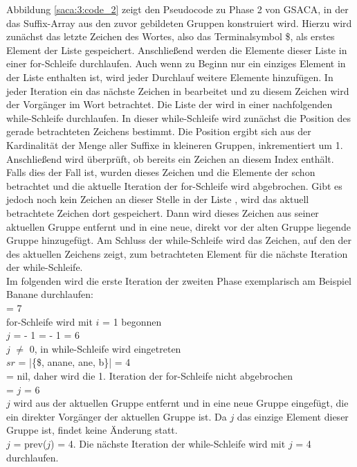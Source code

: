Abbildung \ref{saca:3:code_2} zeigt den Pseudocode zu Phase 2 von GSACA, in der das Suffix-Array aus den zuvor gebildeten Gruppen konstruiert wird.
Hierzu wird zunächst das letzte Zeichen des Wortes, also das Terminalsymbol \$, als erstes Element der Liste \sa gespeichert. 
Anschließend werden die Elemente dieser Liste in einer for-Schleife durchlaufen.
Auch wenn zu Beginn nur ein einziges Element in der Liste enthalten ist, wird jeder Durchlauf weitere Elemente hinzufügen.
In jeder Iteration ein das nächste Zeichen in \sa bearbeitet und zu diesem Zeichen wird der Vorgänger im Wort betrachtet. 
Die Liste der \prevpointer wird in einer nachfolgenden while-Schleife durchlaufen.
In dieser while-Schleife wird zunächst die Position des gerade betrachteten Zeichens bestimmt. 
Die Position ergibt sich aus der Kardinalität der Menge aller Suffixe in kleineren Gruppen, inkrementiert um 1. 
Anschließend wird überprüft, ob \sa bereits ein Zeichen an diesem Index enthält. 
Falls dies der Fall ist, wurden dieses Zeichen und die Elemente der \prevpointer schon betrachtet und die aktuelle Iteration der for-Schleife wird abgebrochen. 
Gibt es jedoch noch kein Zeichen an dieser Stelle in der Liste \sa, wird das aktuell betrachtete Zeichen dort gespeichert. 
Dann wird dieses Zeichen aus seiner aktuellen Gruppe entfernt und in eine neue, direkt vor der alten Gruppe liegende Gruppe hinzugefügt.
Am Schluss der while-Schleife wird das Zeichen, auf den der \prevpointer des aktuellen Zeichens zeigt, zum betrachteten Element für die nächste Iteration der while-Schleife.\\

Im folgenden wird die erste Iteration der zweiten Phase exemplarisch am Beispiel Banane durchlaufen:\\
\sa[1] = 7\\
for-Schleife wird mit $i$ = 1 begonnen\\
$j$ = \sa[$i$] - 1 = \sa[1] - 1 = 6\\
$j$ $\neq$ 0, in while-Schleife wird eingetreten\\
$sr$ = |\{\$, anane, ane, b\}| = 4\\
\sa[$sr$ + 1] = nil, daher wird die 1. Iteration der for-Schleife nicht abgebrochen\\
\sa[$sr$ + 1] = $j$ = 6\\
$j$ wird aus der aktuellen Gruppe entfernt und in eine neue Gruppe eingefügt, die ein direkter Vorgänger der aktuellen Gruppe ist. Da $j$ das einzige Element dieser Gruppe ist, findet keine Änderung statt.\\
$j$ = prev($j$) = 4. Die nächste Iteration der while-Schleife wird mit $j$ = 4 durchlaufen.


\clearpage %
